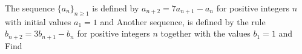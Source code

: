 The sequence $\{a_n\}_{n\geq 1}$ is defined by $a_{n+2}=7a_{n+1}-a_n$ for positive integers $n$ with initial values $a_1=1$ and   Another sequence,  is defined by the rule $b_{n+2}=3b_{n+1}-b_n$ for positive integers $n$ together with the values $b_1=1$ and   Find 